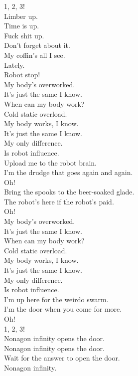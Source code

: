 1, 2, 3! \\

Limber up. \\
Time is up. \\
Fuck shit up. \\
Don't forget about it. \\
My coffin's all I see. \\
Lately. \\
Robot stop! \\

My body's overworked. \\
It's just the same I know. \\
When can my body work? \\
Cold static overload. \\
My body works, I know. \\
It's just the same I know. \\
My only difference. \\
Is robot influence. \\

Upload me to the robot brain. \\
I'm the drudge that goes again and again. \\
Oh! \\

Bring the spooks to the beer-soaked glade. \\
The robot's here if the robot's paid. \\
Oh! \\

My body's overworked. \\
It's just the same I know. \\
When can my body work? \\
Cold static overload. \\
My body works, I know. \\
It's just the same I know. \\
My only difference. \\
Is robot influence. \\

I'm up here for the weirdo swarm. \\
I'm the door when you come for more. \\
Oh! \\

1, 2, 3! \\

Nonagon infinity opens the door. \\
Nonagon infinity opens the door. \\
Wait for the answer to open the door. \\
Nonagon infinity. \\

